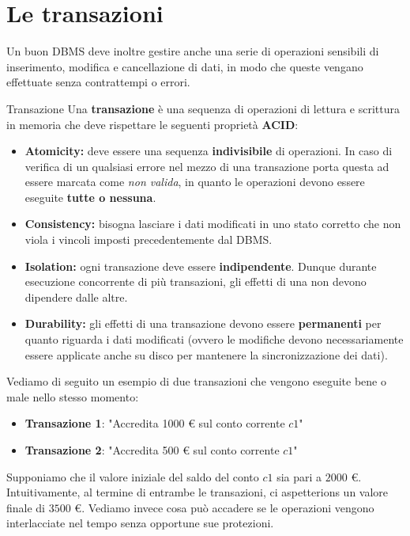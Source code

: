 \documentclass[12pt]{report}
\begin{document}
	\section{Le transazioni}
	\label{sec:transazioni}
	Un buon DBMS deve inoltre gestire anche una serie di operazioni sensibili di inserimento, modifica e cancellazione di dati, in modo che queste vengano effettuate senza contrattempi o errori.
	\begin{definizione}{Transazione}{}
		Una \textbf{transazione} è una sequenza di operazioni di lettura e scrittura in memoria che deve rispettare le seguenti proprietà \textbf{ACID}:
		\begin{itemize}
			\item \textbf{Atomicity:} deve essere una sequenza \textbf{indivisibile} di operazioni. In caso di verifica di un qualsiasi errore nel mezzo di una transazione porta questa ad essere marcata come \textit{non valida}, in quanto le operazioni devono essere eseguite \textbf{tutte o nessuna}.
			
			\item \textbf{Consistency:} bisogna lasciare i dati modificati in uno stato corretto che non viola i vincoli imposti precedentemente dal DBMS.
			
			\item \textbf{Isolation:} ogni transazione deve essere \textbf{indipendente}. Dunque durante esecuzione concorrente di più transazioni, gli effetti di una non devono dipendere dalle altre.
			
			\item \textbf{Durability:} gli effetti di una transazione devono essere \textbf{permanenti} per quanto riguarda i dati modificati (ovvero le modifiche devono necessariamente essere applicate anche su disco per mantenere la sincronizzazione dei dati).
		\end{itemize}
	\end{definizione}
	
	Vediamo di seguito un esempio di due transazioni che vengono eseguite bene o male nello stesso momento:
	
	\begin{itemize}
		\item \textbf{Transazione 1}: "Accredita 1000 € sul conto corrente $c1$"
		\item \textbf{Transazione 2}: "Accredita 500 € sul conto corrente $c1$"
	\end{itemize}
	
	Supponiamo che il valore iniziale del saldo del conto $c1$ sia pari a $2000$ €. Intuitivamente, al termine di entrambe le transazioni, ci aspetterions un valore finale di $3500$ €. Vediamo invece cosa può accadere se le operazioni vengono interlacciate nel tempo senza opportune 
	sue protezioni.
	
\end{document}
